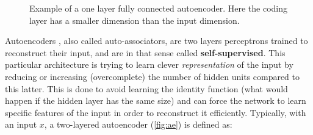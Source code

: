 \documentclass[master, tikz, final,11pt, dvipdfmx]{iscs-thesis}
\begin{document}
\begin{figure}[!hb]

\centering
{}
\caption[Simple one-layered fully connected autoencoder]{Example of a one layer fully connected autoencoder. Here the coding layer has a smaller dimension than the input dimension.}
\label{fig:ae}
\end{figure}

Autoencoders \cite{AE}, also called auto-associators, are two layers perceptrons trained to reconstruct their input, and are in that sense called \textbf{self-supervised}. This particular architecture is trying to learn clever \textit{representation} of the input by reducing or increasing (overcomplete) the number of hidden units compared to this latter. This is done to avoid learning the identity function (what would happen if the hidden layer has the same size) and can force the network to learn specific features of the input in order to reconstruct it efficiently. Typically, with an input $x$, a two-layered autoencoder (\autoref{fig:ae}) is defined as:
\end{document}
